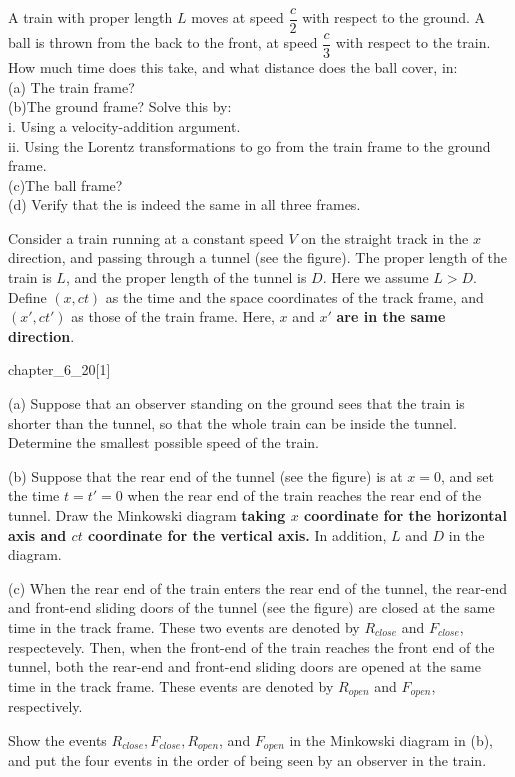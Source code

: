 \begin{example}
    A train with proper length $L$ moves at speed $\dfrac{c}{2}$ with respect to the ground. A ball is thrown from the back to the front, at speed $\dfrac{c}{3}$ with respect to the train. How much time does this take, and what distance does the ball cover, in:
    \\(a) The train frame?
    \\(b)The ground frame? Solve this by:
    \\\hspace*{2em}i. Using a velocity-addition argument.
    \\\hspace*{2em}ii. Using the Lorentz transformations to go from the train
    frame to the ground frame.
    \\(c)The ball frame?
    \\(d) Verify that the  is indeed the same in all three
    frames.
\end{example}
\begin{example}
    Consider a train running at a constant speed $V$ on the straight track in the $x$ direction, and passing through a tunnel (see the figure). The proper length of the train is $L$, and the proper length of the tunnel is $D$. Here we assume $L>D$. Define $(x,ct)$ as the time and the space coordinates of the track frame, and $(x',ct')$ as those of the train frame. Here, $x$ and $x' $\textbf{ are in the same direction}.
    \begin{singlefigure}{chapter_6_20}[1]
    \end{singlefigure}
    (a) Suppose that an observer standing on the ground sees that the train is shorter than the tunnel, so that the whole train can be inside the tunnel. Determine the smallest possible speed of the train.

    (b) Suppose that the rear end of the tunnel (see the figure) is at $x=0$, and set the time $t=t'=0$ when the rear end of the train reaches the rear end of the tunnel. Draw the Minkowski diagram \textbf{ taking $x$ coordinate for the horizontal axis and $ct$ coordinate for the vertical axis.} In addition,  $L$ and $D$ in the diagram.

    (c) When the rear end of the train enters the rear end of the tunnel, the rear-end and front-end sliding doors of the tunnel (see the figure) are closed at the same time in the track frame. These two events are denoted by $R_{close}$ and $F_{close}$, respectevely. Then, when the front-end of the train reaches the front end of the tunnel, both the rear-end and front-end sliding doors are opened at the same time in the track frame. These events are denoted by $R_{open}$ and $F_{open}$, respectively.

    Show the events $R_{close},F_{close},R_{open}$, and $F_{open}$ in the Minkowski diagram in (b),
    and put the four events in the order of being seen by an observer in the train.
\end{example}

